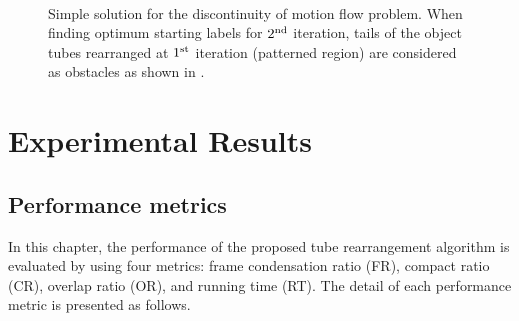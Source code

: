 \documentclass[11pt]{hyu_thesis}
\begin{document}
\begin{figure}
	\\
	\caption{Simple solution for the discontinuity of motion flow problem. When finding optimum starting labels for $2^{\rm{nd}}$ iteration, tails of the object tubes rearranged at $1^{\rm{st}}$ iteration (patterned region) are considered as obstacles as shown in \protect{}.}
	\label{fig:discontinuity}
\end{figure}

\chapter{Experimental Results}
\label{sec:exp}

\section{Performance metrics}
In this chapter, the performance of the proposed tube rearrangement algorithm is evaluated by using four metrics: frame condensation ratio (FR), compact ratio (CR), overlap ratio (OR), and running time (RT). The detail of each performance metric is presented as follows.
\end{document}
